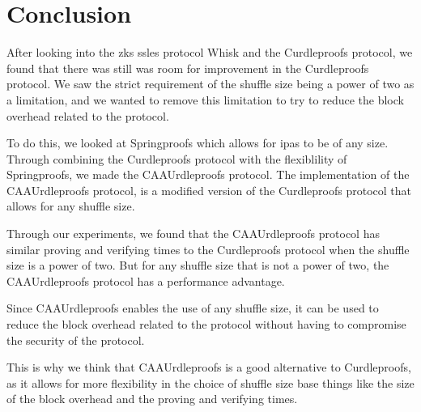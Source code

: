 

\section{Conclusion}\label{sec:conclusion}
After looking into the \glspl{zk} \glspl{ssle} protocol Whisk and the Curdleproofs protocol, we found that there was still was room for improvement in the Curdleproofs protocol.
We saw the strict requirement of the shuffle size being a power of two as a limitation, and we wanted to remove this limitation to try to reduce the block overhead related to the protocol.

To do this, we looked at Springproofs which allows for \glspl{ipa} to be of any size.
Through combining the Curdleproofs protocol with the flexiblility of Springproofs, we made the CAAUrdleproofs protocol.
The implementation of the CAAUrdleproofs protocol, is a modified version of the Curdleproofs protocol that allows for any shuffle size.

Through our experiments, we found that the CAAUrdleproofs protocol has similar proving and verifying times to the Curdleproofs protocol when the shuffle size is a power of two.
But for any shuffle size that is not a power of two, the CAAUrdleproofs protocol has a performance advantage.

Since CAAUrdleproofs enables the use of any shuffle size, it can be used to reduce the block overhead related to the protocol without having to compromise the security of the protocol.

This is why we think that CAAUrdleproofs is a good alternative to Curdleproofs, as it allows for more flexibility in the choice of shuffle size base things like the size of the block overhead and the proving and verifying times.
